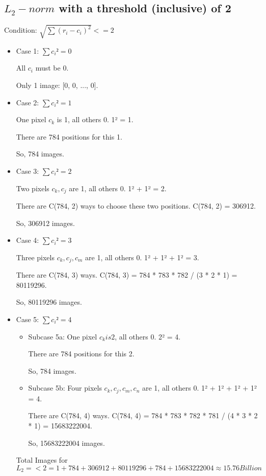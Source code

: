 \subsection*{$L_2-norm$ with a threshold (inclusive) of 2}
Condition: $\sqrt{\sum (r_i - c_i)^2} <= 2$
\begin{itemize}
    \item Case 1: $\sum c_i² = 0$

        All $c_i$ must be 0.

        Only 1 image: [0, 0, ..., 0].

    \item Case 2: $\sum c_i² = 1$

        One pixel $c_k$ is 1, all others 0. 1² = 1.

        There are 784 positions for this 1.

        So, 784 images.

    \item Case 3: $\sum c_i² = 2$

        Two pixels $c_k, c_j$ are 1, all others 0. 1² + 1² = 2.

        There are C(784, 2) ways to choose these two positions. C(784, 2) = 306912.

        So, 306912 images.

    \item Case 4: $\sum c_i² = 3$

        Three pixels $c_k, c_j, c_m$ are 1, all others 0. 1² + 1² + 1² = 3.

        There are C(784, 3) ways. C(784, 3) = 784 * 783 * 782 / (3 * 2 * 1) = 80119296.

        So, 80119296 images.

    \item Case 5: $\sum c_i² = 4$
    \begin{itemize}
        \item Subcase 5a: One pixel $c_k is 2$, all others 0. 2² = 4.

            There are 784 positions for this 2.

            So, 784 images.

        \item Subcase 5b: Four pixels $c_k, c_j, c_m, c_n$ are 1, all others 0. 1² + 1² + 1² + 1² = 4.

            There are C(784, 4) ways. C(784, 4) = 784 * 783 * 782 * 781 / (4 * 3 * 2 * 1) = 15683222004.

            So, 15683222004 images.
        \end{itemize}

Total Images for $L_2 =< 2 = 1 + 784 + 306912 + 80119296 + 784 + 15683222004 \approx 15.76 Billion$

\end{itemize}

